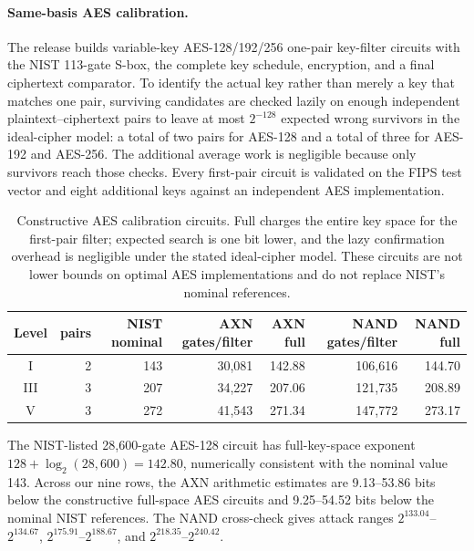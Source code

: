 \documentclass[11pt]{article}
\newcommand{\LoneNANDRange}{$2^{133.04}$--$2^{134.67}$}
\newcommand{\LthreeNANDRange}{$2^{175.91}$--$2^{188.67}$}
\newcommand{\LfiveNANDRange}{$2^{218.35}$--$2^{240.42}$}
\newcommand{\AXNNominalHeadroomRange}{9.25--54.52}
\newcommand{\AXNFullAESGapRange}{9.13--53.86}
\begin{document}
\paragraph{Same-basis AES calibration.}
The release builds variable-key AES-128/192/256 one-pair key-filter circuits
with the NIST 113-gate S-box, the complete key schedule, encryption, and a
final ciphertext comparator.  To identify the actual key rather than merely a
key that matches one pair, surviving candidates are checked lazily on enough
independent plaintext--ciphertext pairs to leave at most $2^{-128}$ expected
wrong survivors in the ideal-cipher model: a total of two pairs for AES-128 and
a total of three for AES-192 and AES-256.  The additional average work is
negligible because only
survivors reach those checks.  Every first-pair circuit is validated on the
FIPS test vector and eight additional keys against an independent AES
implementation.

\begin{table}[tbp]
\centering
\caption{Constructive AES calibration circuits.  Full charges the entire key
space for the first-pair filter; expected search is one bit lower, and the
lazy confirmation overhead is negligible under the stated ideal-cipher model.
These circuits are not lower bounds on optimal AES implementations and do not
replace NIST's nominal references.}
\label{tab:aes-calibration}
\scriptsize
\setlength{\tabcolsep}{3.5pt}
\begin{tabular}{@{}c r r r r r r@{}}
\toprule
Level & pairs & NIST nominal & AXN gates/filter & AXN full & NAND gates/filter & NAND full\\
\midrule
I   & 2 & 143 & 30,081 & 142.88 & 106,616 & 144.70\\
III & 3 & 207 & 34,227 & 207.06 & 121,735 & 208.89\\
V   & 3 & 272 & 41,543 & 271.34 & 147,772 & 273.17\\
\bottomrule
\end{tabular}
\end{table}

The NIST-listed 28,600-gate AES-128 circuit has full-key-space exponent
$128+\log_2(28{,}600)=142.80$, numerically consistent with the nominal value
143.  Across our nine rows, the AXN arithmetic estimates are
\AXNFullAESGapRange{} bits below the constructive full-space AES circuits and
\AXNNominalHeadroomRange{} bits below the nominal NIST references.  The NAND
cross-check gives attack ranges \LoneNANDRange, \LthreeNANDRange, and
\LfiveNANDRange.
\end{document}
